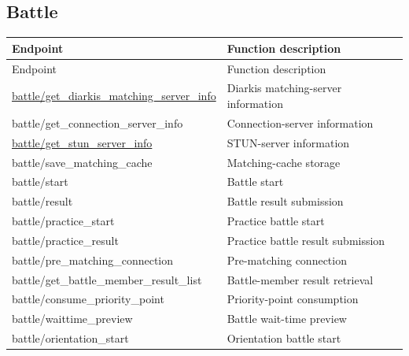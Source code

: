 \subsection{Battle}

\begin{longtable}{>{\ttfamily}p{}p{}}
\toprule
Endpoint & Function description \\
\midrule
\endfirsthead%

\toprule
Endpoint & Function description \\
\midrule
\endhead%

\hyperref[subsec:api_battle_get_diarkis_matching_server_info]
    {battle/get\_diarkis\_matching\_server\_info}
    & Diarkis matching-server information \\

battle/get\_connection\_server\_info
    & Connection-server information \\

\hyperref[subsec:api_battle_get_stun_server_info]
    {battle/get\_stun\_server\_info}
    & STUN-server information \\

battle/save\_matching\_cache
    & Matching-cache storage \\

battle/start
    & Battle start \\

battle/result
    & Battle result submission \\

battle/practice\_start
    & Practice battle start \\

battle/practice\_result
    & Practice battle result submission \\

battle/pre\_matching\_connection
    & Pre-matching connection \\

battle/get\_battle\_member\_result\_list
    & Battle-member result retrieval \\

battle/consume\_priority\_point
    & Priority-point consumption \\

battle/waittime\_preview
    & Battle wait-time preview \\

battle/orientation\_start
    & Orientation battle start \\


\end{longtable}
